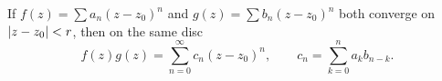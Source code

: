 \begin{theorem}\label{thm:cauchy-product}
  If $f(z) = \sum a_n (z - z_0)^n$ and $g(z) = \sum b_n (z - z_0)^n$ both
  converge on $\lvert z - z_0\rvert < r$, then on the same disc
  \[
    f(z) g(z) = \sum_{n=0}^{\infty} c_n (z - z_0)^n,
    \qquad c_n = \sum_{k=0}^{n} a_k b_{n-k}.
  \]
\end{theorem}
